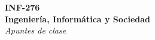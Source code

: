 \thispagestyle{empty}

\begin{center}
  \Huge
  \textbf{INF-276 \\ Ingeniería, Informática y Sociedad} \\
  \emph{Apuntes de clase}
\end{center}

\clearpage
